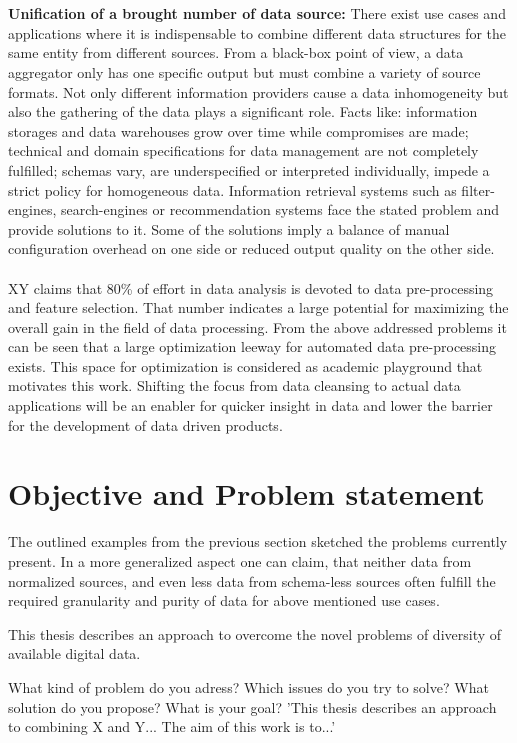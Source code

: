 \\\\
\textbf{Unification of a brought number of data source:} There exist use cases and applications where it is indispensable to combine different data structures for the same entity from different sources. From a black-box point of view, a data aggregator only has one specific output but must combine a variety of source formats. Not only different information providers cause a data  inhomogeneity but also the gathering of the data plays a significant role. Facts like: information storages and data warehouses grow over time while compromises are made; technical and domain specifications for data management are not completely fulfilled; schemas vary, are underspecified or interpreted individually, impede a strict policy for homogeneous data. Information retrieval systems such as filter-engines, search-engines or recommendation systems face the stated problem and provide solutions to it. Some of the solutions imply a balance of manual configuration overhead on one side or reduced output quality on the other side. 
\\\\
XY claims that 80\% of effort in data analysis is devoted to data pre-processing and feature selection. That number indicates a large potential for maximizing the overall gain in the field of data processing. From the above addressed problems it can be seen that a large optimization leeway for automated data pre-processing exists. This space for optimization is considered as academic playground that motivates this work. Shifting the focus from data cleansing to actual data applications will be an enabler for quicker insight in data and lower the barrier for the development of data driven products.

\section{Objective and Problem statement\label{sec:objective}}
The outlined examples from the previous section sketched the problems currently present. In a more generalized aspect one can claim, that neither data from normalized sources, and even less data from schema-less sources often fulfill the required granularity and purity of data for above mentioned use cases. 

This thesis describes an approach to overcome the novel problems of diversity of available digital data. 


What kind of problem do you adress? Which issues do you try to solve? What solution do you propose? What is your goal?
'This thesis describes an approach to combining X and Y... The aim of this work is to...'

